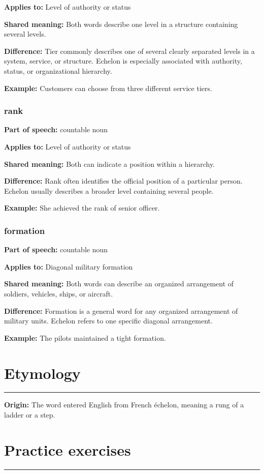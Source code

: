 \documentclass[11pt]{article}
\newcommand{\sectionrule}{\par\vspace{-0.5em}\noindent\textcolor{Accent}{\rule{\linewidth}{0.6pt}}\par}
\begin{document}
\textbf{Applies to:} Level of authority or status

\textbf{Shared meaning:} Both words describe one level in a structure containing several levels.

\textbf{Difference:} Tier commonly describes one of several clearly separated levels in a system, service, or structure. Echelon is especially associated with authority, status, or organizational hierarchy.

\textbf{Example:} Customers can choose from three different service tiers.

\subsubsection{rank}
\textbf{Part of speech:} countable noun

\textbf{Applies to:} Level of authority or status

\textbf{Shared meaning:} Both can indicate a position within a hierarchy.

\textbf{Difference:} Rank often identifies the official position of a particular person. Echelon usually describes a broader level containing several people.

\textbf{Example:} She achieved the rank of senior officer.

\subsubsection{formation}
\textbf{Part of speech:} countable noun

\textbf{Applies to:} Diagonal military formation

\textbf{Shared meaning:} Both words can describe an organized arrangement of soldiers, vehicles, ships, or aircraft.

\textbf{Difference:} Formation is a general word for any organized arrangement of military units. Echelon refers to one specific diagonal arrangement.

\textbf{Example:} The pilots maintained a tight formation.

\section{Etymology}
\sectionrule
\textbf{Origin:} The word entered English from French échelon, meaning a rung of a ladder or a step.

\section{Practice exercises}
\sectionrule
\end{document}

